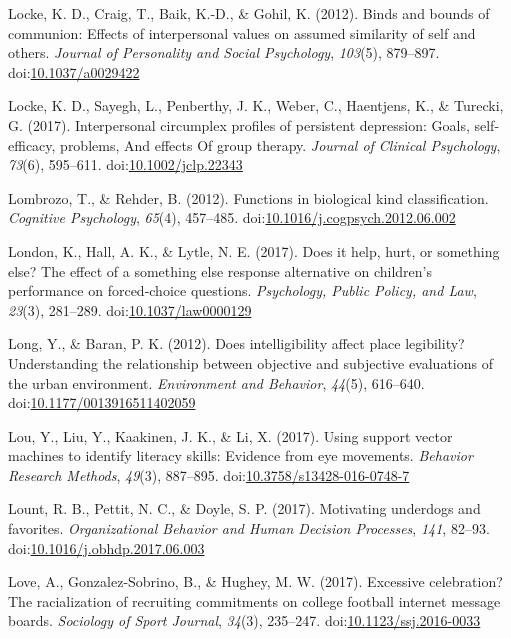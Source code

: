 \documentclass[english,man]{apa6}
\theoremstyle{definition}
\theoremstyle{definition}
\theoremstyle{definition}
\theoremstyle{remark}
\begin{document}
\hypertarget{ref-Locke}{}
Locke, K. D., Craig, T., Baik, K.-D., \& Gohil, K. (2012). Binds and
bounds of communion: Effects of interpersonal values on assumed
similarity of self and others. \emph{Journal of Personality and Social
Psychology}, \emph{103}(5), 879--897.
doi:\href{https://doi.org/10.1037/a0029422}{10.1037/a0029422}

\hypertarget{ref-Locke2017}{}
Locke, K. D., Sayegh, L., Penberthy, J. K., Weber, C., Haentjens, K., \&
Turecki, G. (2017). Interpersonal circumplex profiles of persistent
depression: Goals, self-efficacy, problems, And effects Of group
therapy. \emph{Journal of Clinical Psychology}, \emph{73}(6), 595--611.
doi:\href{https://doi.org/10.1002/jclp.22343}{10.1002/jclp.22343}

\hypertarget{ref-Lombrozo2012}{}
Lombrozo, T., \& Rehder, B. (2012). Functions in biological kind
classification. \emph{Cognitive Psychology}, \emph{65}(4), 457--485.
doi:\href{https://doi.org/10.1016/j.cogpsych.2012.06.002}{10.1016/j.cogpsych.2012.06.002}

\hypertarget{ref-London2017}{}
London, K., Hall, A. K., \& Lytle, N. E. (2017). Does it help, hurt, or
something else? The effect of a something else response alternative on
children's performance on forced-choice questions. \emph{Psychology,
Public Policy, and Law}, \emph{23}(3), 281--289.
doi:\href{https://doi.org/10.1037/law0000129}{10.1037/law0000129}

\hypertarget{ref-Long2012}{}
Long, Y., \& Baran, P. K. (2012). Does intelligibility affect place
legibility? Understanding the relationship between objective and
subjective evaluations of the urban environment. \emph{Environment and
Behavior}, \emph{44}(5), 616--640.
doi:\href{https://doi.org/10.1177/0013916511402059}{10.1177/0013916511402059}

\hypertarget{ref-Lou2017}{}
Lou, Y., Liu, Y., Kaakinen, J. K., \& Li, X. (2017). Using support
vector machines to identify literacy skills: Evidence from eye
movements. \emph{Behavior Research Methods}, \emph{49}(3), 887--895.
doi:\href{https://doi.org/10.3758/s13428-016-0748-7}{10.3758/s13428-016-0748-7}

\hypertarget{ref-Lount2017}{}
Lount, R. B., Pettit, N. C., \& Doyle, S. P. (2017). Motivating
underdogs and favorites. \emph{Organizational Behavior and Human
Decision Processes}, \emph{141}, 82--93.
doi:\href{https://doi.org/10.1016/j.obhdp.2017.06.003}{10.1016/j.obhdp.2017.06.003}

\hypertarget{ref-Love2017}{}
Love, A., Gonzalez-Sobrino, B., \& Hughey, M. W. (2017). Excessive
celebration? The racialization of recruiting commitments on college
football internet message boards. \emph{Sociology of Sport Journal},
\emph{34}(3), 235--247.
doi:\href{https://doi.org/10.1123/ssj.2016-0033}{10.1123/ssj.2016-0033}
\end{document}
